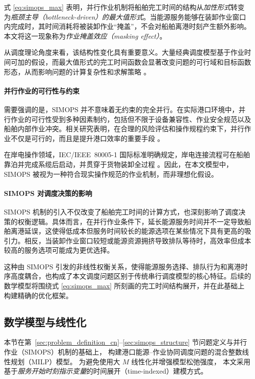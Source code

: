 \documentclass[UTF8, a4paper, 12pt]{ctexart}
\begin{document}
式 \eqref{eq:simops_max} 表明，并行作业机制将船舶完工时间的结构从\emph{加性形式}转变为\emph{瓶颈主导（bottleneck-driven）的最大值形式}。当能源服务能够在装卸作业窗口内完成时，其时间消耗将被装卸作业“掩盖”，不会对船舶离港时刻产生额外影响。本文将这一现象称为\emph{作业掩盖效应（masking effect）}。

从调度理论角度来看，该结构性变化具有重要意义。大量经典调度模型基于作业时间可加的假设，而最大值形式的完工时间函数会显著改变问题的可行域和目标函数形态，从而影响问题的计算复杂性和求解策略 \cite{brucker2007scheduling,pinedo2016scheduling}。

\paragraph{并行作业的可行性与约束}
需要强调的是，SIMOPS 并不意味着无约束的完全并行。在实际港口环境中，并行作业的可行性受到多种因素制约，包括但不限于设备兼容性、作业安全规范以及船舶内部作业冲突。相关研究表明，在合理的风险评估和操作规程约束下，并行作业不仅是可行的，而且是提升港口效率的重要手段 \cite{Fan2021}。

在岸电操作领域，IEC/IEEE~80005-1 国际标准明确规定，岸电连接流程可在船舶靠泊并完成系缆后启动，并贯穿于货物装卸全过程 \cite{IEC80005}。因此，在本文模型中，SIMOPS 被视为一种符合现实操作规范的作业机制，而非理想化假设。

\paragraph{SIMOPS 对调度决策的影响}
SIMOPS 机制的引入不仅改变了船舶完工时间的计算方式，也深刻影响了调度决策的权衡逻辑。具体而言，在并行作业条件下，延长能源服务时间并不一定导致船舶离港延误，这使得低成本但服务时间较长的能源选项在某些情况下具有更高的吸引力。相反，当装卸作业窗口较短或能源资源拥挤导致排队等待时，高效率但成本较高的服务选项可能成为更优选择。

这种由 SIMOPS 引发的非线性权衡关系，使得能源服务选择、排队行为和离港时序高度耦合，也构成了本文调度问题区别于传统串行调度模型的核心特征。后续的数学模型将围绕式 \eqref{eq:simops_max} 所刻画的完工时间结构展开，并在此基础上构建精确的优化框架。


\subsection{数学模型与线性化}
\label{sec:model_formulation}

本节在第~\ref{sec:problem_definition_cn}--\ref{sec:simops_structure} 节问题定义与并行作业（SIMOPS）机制的基础上，
构建港口能源--作业协同调度问题的混合整数线性规划（MILP）模型。
为避免使用大 $M$ 线性化并增强模型松弛强度，
本文采用基于\emph{服务开始时刻指示变量}的时间展开（time-indexed）建模方式。
\end{document}
